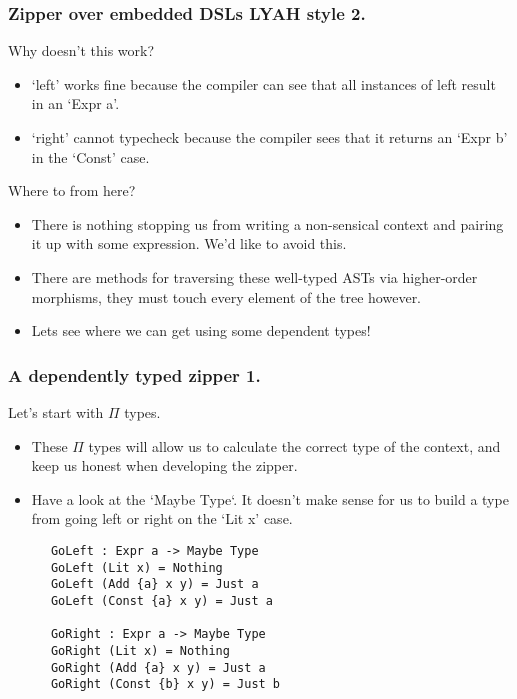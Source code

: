 \documentclass{beamer}
\begin{document}
\begin{frame}[fragile]
  \frametitle{Zipper over embedded DSLs LYAH style 2.}
  \begin{block}{Why doesn't this work?}
    \begin{itemize}
      \item `left' works fine because the compiler can see
        that all instances of left result in an `Expr a'.
      \item `right' cannot typecheck because the compiler
        sees that it returns an `Expr b' in the `Const' case.
    \end{itemize}
  \end{block}
  \begin{block}{Where to from here?}
    \begin{itemize}
      \item There is nothing stopping us from writing a non-sensical
        context and pairing it up with some expression. We'd like to
        avoid this.
      \item There are methods for traversing these well-typed ASTs
        via higher-order morphisms, they must touch every element of
        the tree however.
      \item Lets see where we can get using some dependent types!
    \end{itemize}
  \end{block}
\end{frame}

\begin{frame}[fragile]
  \frametitle{A dependently typed zipper 1.}
  \begin{block}{Let's start with $\Pi$ types.}
    \begin{itemize}
    \item These $\Pi$ types will allow us to calculate the correct type
          of the context, and keep us honest when developing the zipper.
    \item Have a look at the `Maybe Type`. It doesn't make sense for us to
          build a type from going left or right on the `Lit x' case.
    \end{itemize}
    \begin{verbatim}
      GoLeft : Expr a -> Maybe Type
      GoLeft (Lit x) = Nothing
      GoLeft (Add {a} x y) = Just a
      GoLeft (Const {a} x y) = Just a

      GoRight : Expr a -> Maybe Type
      GoRight (Lit x) = Nothing
      GoRight (Add {a} x y) = Just a
      GoRight (Const {b} x y) = Just b
    \end{verbatim}
  \end{block}
\end{frame}
\end{document}
